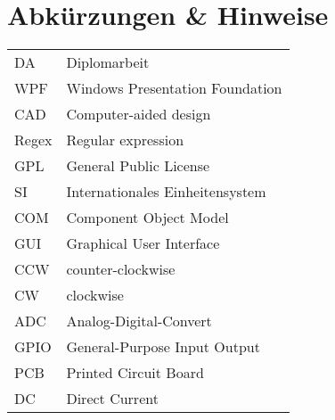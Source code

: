 \section*{Abkürzungen \& Hinweise}
\begin{singlespace}
	\begin{tabular}{ll}
		DA     & Diplomarbeit \\
		WPF    & Windows Presentation Foundation \\
		CAD    & Computer-aided design \\
		Regex  & Regular expression \\
		GPL    & General Public License  \\
		SI     & Internationales Einheitensystem \\
		COM    & Component Object Model \\
		GUI    & Graphical User Interface \\
		CCW	   & counter-clockwise \\
		CW     & clockwise \\
		ADC	   & Analog-Digital-Convert \\
		GPIO   & General-Purpose Input Output \\
		PCB	   & Printed Circuit Board \\
		DC     & Direct Current \\
	\end{tabular}
\end{singlespace}

\pagebreak
